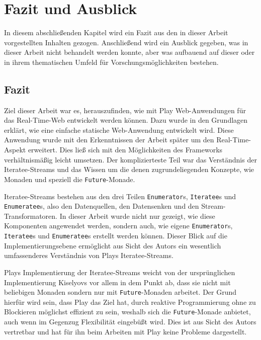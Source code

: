 
\chapter{Fazit und Ausblick} %
\label{cha:fazit_und_ausblick}

In diesem abschließenden Kapitel wird ein Fazit aus den in dieser Arbeit vorgestellten Inhalten gezogen.
Anschließend wird ein Ausblick gegeben, was in dieser Arbeit nicht behandelt werden konnte, aber was aufbauend auf dieser oder in ihrem thematischen Umfeld für Vorschungsmöglichkeiten bestehen.

\section{Fazit} %
\label{sec:fazit}

Ziel dieser Arbeit war es, herauszufinden, wie mit Play Web-Anwendungen für das Real-Time-Web entwickelt werden können.
Dazu wurde in den Grundlagen erklärt, wie eine einfache statische Web-Anwendung entwickelt wird.
Diese Anwendung wurde mit den Erkenntnissen der Arbeit später um den Real-Time-Aspekt erweitert.
Dies ließ sich mit den Möglichkeiten des Frameworks verhältnismäßig leicht umsetzen.
Der komplizierteste Teil war das Verständnis der Iteratee-Streams und das Wissen um die denen zugrundeliegenden Konzepte, wie Monaden und speziell die \lstinline|Future|-Monade.

Iteratee-Streams bestehen aus den drei Teilen \lstinline|Enumerator|s, \lstinline|Iteratee|s und \lstinline|Enumeratee|s, also den Datenquellen, den Datensenken und den Stream-Transformatoren.
In dieser Arbeit wurde nicht nur gezeigt, wie diese Komponenten angewendet werden, sondern auch, wie eigene \lstinline|Enumerator|s, \lstinline|Iteratee|s und \lstinline|Enumeratee|s erstellt werden können.
Dieser Blick auf die Implementierungsebene ermöglicht aus Sicht des Autors ein wesentlich umfassenderes Verständnis von Plays Iteratee-Streams.

Plays Implementierung der Iteratee-Streams weicht von der ursprünglichen Implementierung Kiselyovs vor allem in dem Punkt ab, dass sie nicht mit beliebigen Monaden sondern nur mit \lstinline|Future|-Monaden arbeitet.
Der Grund hierfür wird sein, dass Play das Ziel hat, durch reaktive Programmierung ohne zu Blockieren möglichst effizient zu sein, weshalb sich die \lstinline|Future|-Monade anbietet, auch wenn im Gegenzug Flexibilität eingebüßt wird.
Dies ist aus Sicht des Autors vertretbar und hat für ihn beim Arbeiten mit Play keine Probleme dargestellt.

